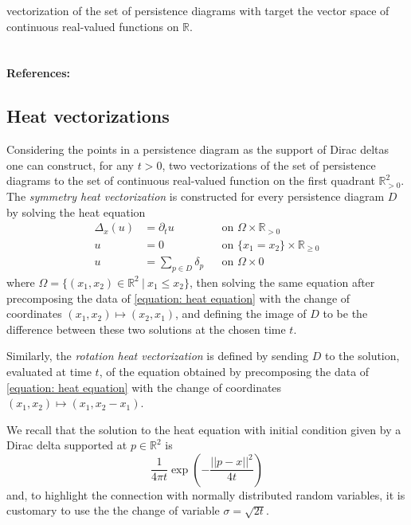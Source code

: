 \documentclass{amsart}
\begin{document}
	vectorization of the set of persistence diagrams with target the vector space of continuous real-valued functions on $\mathbb R$.
	
	\paragraph{\\ References:} \cite{chazal2014stochastic}
	
	\subsection*{Heat vectorizations} \label{heat_vectorization}
	
	Considering the points in a persistence diagram as the support of Dirac deltas one can construct, for any $t > 0$,
	two vectorizations of the set of persistence diagrams to the set of continuous real-valued function on the first quadrant $\mathbb{R}^2_{>0}$. The \textit{symmetry heat vectorization} is constructed for every persistence diagram $D$ by solving the heat equation
	\begin{align} \label{equation: heat equation}
	\Delta_x(u) &= \partial_t u && \text{on } \Omega \times \mathbb R_{>0} \nonumber \\
	u &= 0 && \text{on } \{x_1 = x_2\} \times \mathbb R_{\geq 0} \\
	u &= \sum_{p \in D} \delta_p && \text{on } \Omega \times {0} \nonumber
	\end{align}
	where $\Omega = \{(x_1, x_2) \in \mathbb R^2\ |\ x_1 \leq x_2\}$, then solving the same equation after precomposing the data of \eqref{equation: heat equation} with the change of coordinates $(x_1, x_2) \mapsto (x_2, x_1)$, and defining the image of $D$ to be the difference between these two solutions at the chosen time $t$.
	
	Similarly, the \textit{rotation heat vectorization} is defined by sending $D$ to the solution, evaluated at time $t$, of the equation obtained by precomposing the data of \eqref{equation: heat equation} with the change of coordinates $(x_1, x_2) \mapsto (x_1, x_2-x_1)$.
	
	We recall that the solution to the heat equation with initial condition given by a Dirac delta supported at $p \in \mathbb R^2$ is
	\begin{equation*}
	\frac{1}{4 \pi t} \exp\left(-\frac{||p-x||^2}{4t}\right)
	\end{equation*} 
	and, to highlight the connection with normally distributed random variables, it is customary to use the the change of variable $\sigma = \sqrt{2t}$.
	
\end{document}
